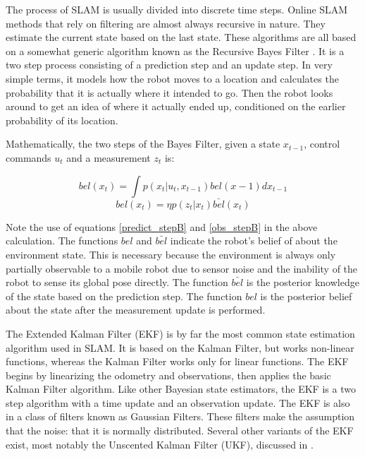 The process of SLAM is usually divided into discrete time steps.  Online SLAM methods that rely on filtering are almost always recursive in nature.  They estimate the current state based on the last state.  These algorithms are all based on a somewhat generic algorithm known as the Recursive Bayes Filter \cite{ThrunPR2005} \cite{diard2003survey}.  It is a two step process consisting of a prediction step and an update step.  In very simple terms, it models how the robot moves to a location and calculates the probability that it is actually where it intended to go.  Then the robot looks around to get an idea of where it actually ended up, conditioned on the earlier probability of its location.

Mathematically, the two steps of the Bayes Filter, given a state $x_{t-1}$, control commands $u_t$ and a measurement $z_t$ is:

\begin{equation}\label{ekf_predict}
bel(x_t) = \int p(x_t| u_t,x_{t-1}) bel(x-1)dx_{t-1}     
\end{equation}
\begin{equation}\label{ekf_measure}
bel(x_t) =η p(z_t|x_t)\bar{bel}(x_t)                           
\end{equation}

Note the use of equations \ref{predict_stepB} and \ref{obs_stepB} in the above calculation.  The functions $bel$ and $\bar{bel}$ indicate the robot's belief of about the environment state.  This is necessary because the environment is always only partially observable to a mobile robot due to sensor noise and the inability of the robot to sense its global pose directly.  The function $\bar{bel}$ is the posterior knowledge of the state based on the prediction step.  The function $bel$ is the posterior belief about the state after the measurement update is performed.

The Extended Kalman Filter (EKF) is by far the most common state estimation algorithm used in SLAM.  It is based on the Kalman Filter, but works non-linear functions, whereas the Kalman Filter works only for linear functions. The EKF begins by linearizing the odometry and observations, then applies the basic Kalman Filter algorithm.  Like other Bayesian state estimators, the EKF is a two step algorithm with a time update and an observation update. The EKF is also in a class of filters known as Gaussian Filters.  These filters make the assumption that the noise: that it is normally distributed.  Several other variants of the EKF exist, most notably the Unscented Kalman Filter (UKF), discussed in \cite{UKF}.

